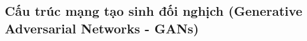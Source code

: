 





\subsection{\texorpdfstring{Cấu trúc mạng tạo sinh đối nghịch (Generative Adversarial Networks - GANs}{gans})}

